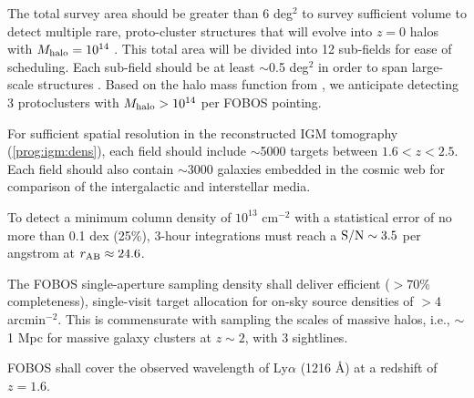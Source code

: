 \documentclass[11pt,a4paper,twoside,onecolumn,openany,final,oldfontcommands]{memoir}
\begin{document}
\begin{programrequirement}
\reqitem The total survey area should be greater than 6 deg$^2$ to survey sufficient volume to detect multiple rare, proto-cluster structures that will evolve into $z=0$ halos with $M_{\rm halo} = 10^{14}$ \msun{}.  This total area will be divided into 12 sub-fields for ease of scheduling.  Each sub-field should be at least $\sim$0.5 deg$^2$ in order to span large-scale structures \citep[10 Mpc; see][]{lee16}.  Based on the halo mass function from \citet{Lukic:2007_highZhaloMassFunc}, we anticipate detecting 3 protoclusters with $M_{\rm halo} > 10^{14}$ \msun{} per FOBOS pointing.

\reqitem For sufficient spatial resolution in the reconstructed IGM tomography (\ref{prog:igm:dens}), each field should include $\sim$5000 targets between $1.6 < z < 2.5$. 
\reqitem Each field should also contain $\sim$3000 galaxies embedded in the cosmic web for comparison of the intergalactic and interstellar media.

\reqitem To detect a minimum  column density of $10^{13}$ cm$^{-2}$ with a statistical error of no more than 0.1 dex (25\%), 3-hour integrations must reach a ${\rm S/N} \sim 3.5$ per angstrom at $r_{\rm AB} \approx 24.6$. 

\end{programrequirement}

\medskip
\begin{sciencerequirement}
\reqitem The FOBOS single-aperture sampling density shall deliver efficient ($>70$\% completeness), single-visit target allocation for on-sky source densities of $>$4 arcmin$^{-2}$.  This is commensurate with sampling the scales of massive halos, i.e., $\sim$1 Mpc for massive galaxy clusters at $z\sim 2$, with 3 sightlines. \label{prog:igm:dens}


\reqitem FOBOS shall cover the observed wavelength of Ly$\alpha$ (1216 \AA{}) at a redshift of $z=1.6$.  

\end{sciencerequirement}
\end{document}
